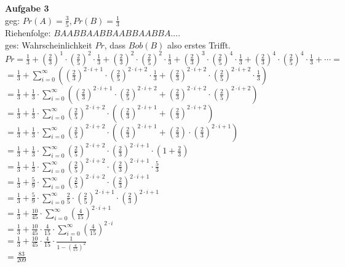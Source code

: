 \documentclass[a4paper]{scrartcl}
\begin{document}
	\begin{flushleft}
		\textbf{Aufgabe 3}\\
		geg: $Pr(A)=\frac{3}{5}, Pr(B)=\frac{1}{3}$\\
		Riehenfolge: $BAABBAABBAABBAABBA....$\\
		ges: Wahrscheinlichkeit $Pr$, dass $Bob(B)$ also erstes Trifft.\\[1em]
		$Pr=\frac{1}{3}+(\frac{2}{3})^1\cdot(\frac{2}{5})^2\cdot\frac{1}{3}+(\frac{2}{3})^2\cdot(\frac{2}{5})^2\cdot\frac{1}{3}+(\frac{2}{3})^3\cdot(\frac{2}{5})^4\cdot\frac{1}{3}+(\frac{2}{3})^4\cdot(\frac{2}{5})^4\cdot\frac{1}{3}+\cdots=$\\
		$=\frac{1}{3}+\sum\limits_{i=0}^{\infty}((\frac{2}{3})^{2\cdot i+1}\cdot(\frac{2}{5})^{2\cdot i+2}\cdot\frac{1}{3} + (\frac{2}{3})^{2\cdot i+2}\cdot(\frac{2}{5})^{2\cdot i+2}\cdot\frac{1}{3})$\\
		$=\frac{1}{3}+\frac{1}{3}\cdot\sum\limits_{i=0}^{\infty}((\frac{2}{3})^{2\cdot i+1}\cdot(\frac{2}{5})^{2\cdot i+2} + (\frac{2}{3})^{2\cdot i+2}\cdot(\frac{2}{5})^{2\cdot i+2})$\\
		$=\frac{1}{3}+\frac{1}{3}\cdot\sum\limits_{i=0}^{\infty}(\frac{2}{5})^{2\cdot i+2}\cdot((\frac{2}{3})^{2\cdot i+1} + (\frac{2}{3})^{2\cdot i+2})$\\
		$=\frac{1}{3}+\frac{1}{3}\cdot\sum\limits_{i=0}^{\infty}(\frac{2}{5})^{2\cdot i+2}\cdot((\frac{2}{3})^{2\cdot i+1} + (\frac{2}{3})\cdot(\frac{2}{3})^{2\cdot i+1})$\\
		$=\frac{1}{3}+\frac{1}{3}\cdot\sum\limits_{i=0}^{\infty}(\frac{2}{5})^{2\cdot i+2}\cdot(\frac{2}{3})^{2\cdot i+1}\cdot(1 + \frac{2}{3})$\\
		$=\frac{1}{3}+\frac{1}{3}\cdot\sum\limits_{i=0}^{\infty}(\frac{2}{5})^{2\cdot i+2}\cdot(\frac{2}{3})^{2\cdot i+1}\cdot\frac{5}{3}$\\
		$=\frac{1}{3}+\frac{5}{9}\cdot\sum\limits_{i=0}^{\infty}(\frac{2}{5})^{2\cdot i+2}\cdot(\frac{2}{3})^{2\cdot i+1}$\\
		$=\frac{1}{3}+\frac{5}{9}\cdot\sum\limits_{i=0}^{\infty}\frac{2}{5}\cdot(\frac{2}{5})^{2\cdot i+1}\cdot(\frac{2}{3})^{2\cdot i+1}$\\
		$=\frac{1}{3}+\frac{10}{45}\cdot\sum\limits_{i=0}^{\infty}(\frac{4}{15})^{2\cdot i+1}$\\ 
		$=\frac{1}{3}+\frac{10}{45}\cdot \frac{4}{15}\cdot\sum\limits_{i=0}^{\infty}(\frac{4}{15})^{2\cdot i}$\\ 	
		$=\frac{1}{3}+\frac{10}{45}\cdot \frac{4}{15}\cdot\frac{1}{1-(\frac{4}{15})^2}$\\ 	
		$=\frac{83}{209}$\\
		\end{flushleft}
\end{document}
